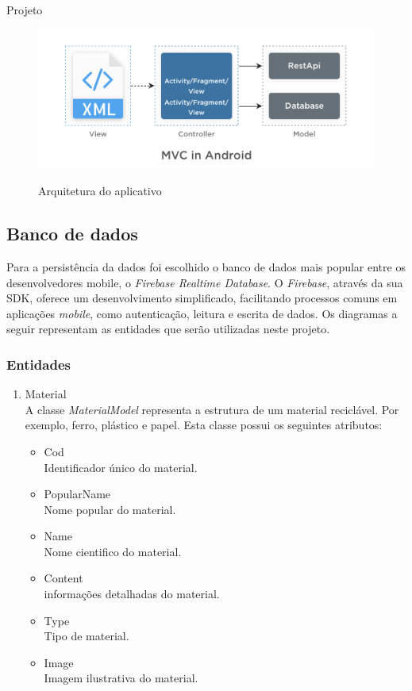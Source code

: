\documentclass[
	12pt,				%
	openany,			%
	twoside,			%
	a4paper,			%
	english,			%
	french,				%
	spanish,			%
	brazil				%
	]{abntex2}
\begin{document}
\begin{chapter}{Projeto}
\begin{figure}[h]
\centering
   \caption{Arquitetura do aplicativo}
   \includegraphics[scale=0.40]{media/MVC.png}
     \label{fig:arquitetura_mvc}
\end{figure}


\subsection{Banco de dados}
Para a persistência da dados foi escolhido o banco de dados mais popular entre os desenvolvedores mobile, o \textit{Firebase Realtime Database}. O \textit{Firebase}, através da sua SDK, oferece um desenvolvimento simplificado, facilitando processos comuns em aplicações \textit{mobile}, como autenticação, leitura e escrita de dados.
 Os diagramas a seguir representam as entidades que serão utilizadas neste projeto.


\subsubsection{Entidades}
\begin{enumerate}
 \item{Material} \\ A classe \textit{MaterialModel} representa a estrutura de um material reciclável. Por exemplo, ferro, plástico e papel. Esta classe possui os seguintes atributos:
 
 \begin{itemize}
  \item{Cod}\\ Identificador único do material.
   \item{PopularName}\\ Nome popular do material.
     \item{Name}\\ Nome cientifico do material.
       \item{Content}\\ informações detalhadas do material.
         \item{Type}\\ Tipo de material.
           \item{Image}\\ Imagem ilustrativa do material.
\end{itemize}
  

\end{enumerate}
\end{chapter}
\end{document}
